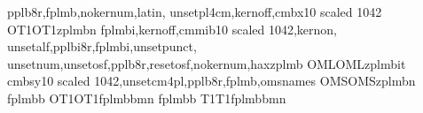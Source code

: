 	{pplb8r,fplmb,nokernum,latin,
	unsetpl4cm,kernoff,cmbx10 scaled 1042}
	{OT1}{OT1}{zplm}{b}{n}{}
	{fplmbi,kernoff,cmmib10 scaled 1042,kernon,
	unsetalf,pplbi8r,fplmbi,unsetpunct,
	unsetnum,unsetosf,pplb8r,resetosf,nokernum,haxzplmb}
	{OML}{OML}{zplm}{b}{it}{}
	{cmbsy10 scaled 1042,unsetcm4pl,pplb8r,fplmb,omsnames}
	{OMS}{OMS}{zplm}{b}{n}{}
\endinstallfonts
%
\installfonts
{}
	{fplmbb}
	{OT1}{OT1}{fplmbb}{m}{n}{}
	{fplmbb}
	{T1}{T1}{fplmbb}{m}{n}{}
\endinstallfonts
\endrecordtransforms
%

\AssumeMetafont %



\donedrivers
{}


\donedrivers
{}

\donedrivers
%
\bye
